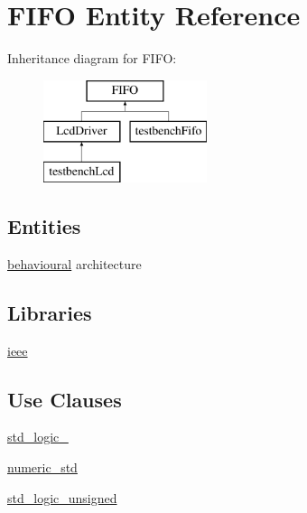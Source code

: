 \hypertarget{classFIFO}{}\section{F\+I\+FO Entity Reference}
\label{classFIFO}
Inheritance diagram for F\+I\+FO\+:\begin{figure}[H]
\begin{center}
\leavevmode
\includegraphics[height=3.000000cm]{classFIFO}
\end{center}
\end{figure}
\subsection*{Entities}
\begin{DoxyCompactItemize}
\item 
\hyperlink{classFIFO_1_1behavioural}{behavioural} architecture
\end{DoxyCompactItemize}
\subsection*{Libraries}
 \begin{DoxyCompactItemize}
\item 
\mbox{\label{classFIFO_a0a6af6eef40212dbaf130d57ce711256}} 
\hyperlink{classFIFO_a0a6af6eef40212dbaf130d57ce711256}{ieee} 
\end{DoxyCompactItemize}
\subsection*{Use Clauses}
 \begin{DoxyCompactItemize}
\item 
\mbox{\label{classFIFO_acd03516902501cd1c7296a98e22c6fcb}} 
\hyperlink{classFIFO_acd03516902501cd1c7296a98e22c6fcb}{std\+\_\+logic\+\_}   
\item 
\mbox{\label{classFIFO_a2edc34402b573437d5f25fa90ba4013e}} 
\hyperlink{classFIFO_a2edc34402b573437d5f25fa90ba4013e}{numeric\+\_\+std}   
\item 
\mbox{\label{classFIFO_a598da929e807d58939b47499e8bc9fa8}} 
\hyperlink{classFIFO_a598da929e807d58939b47499e8bc9fa8}{std\+\_\+logic\+\_\+unsigned}   
\end{DoxyCompactItemize}
